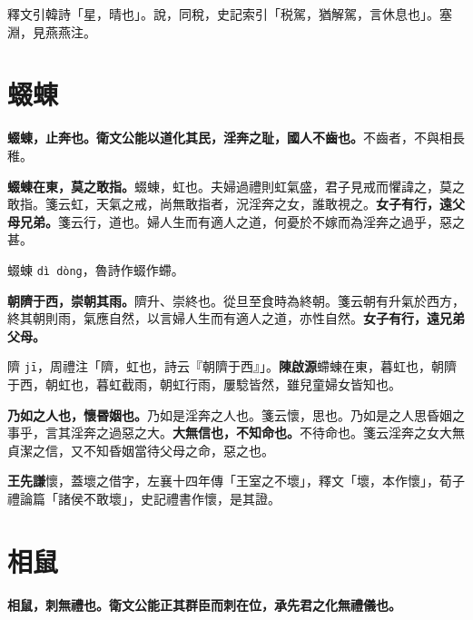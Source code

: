 \begin{quoting}釋文引韓詩「星，晴也」。說，同稅，史記索引「税駕，猶解駕，言休息也」。塞淵，見燕燕注。\end{quoting}

\section{蝃蝀}


\textbf{蝃蝀，止奔也。衛文公能以道化其民，淫奔之耻，國人不齒也。}{\footnotesize 不齒者，不與相長稚。}

\textbf{蝃蝀在東，莫之敢指。}{\footnotesize 蝃蝀，虹也。夫婦過禮則虹氣盛，君子見戒而懼諱之，莫之敢指。箋云虹，天氣之戒，尚無敢指者，況淫奔之女，誰敢視之。}\textbf{女子有行，遠父母兄弟。}{\footnotesize 箋云行，道也。婦人生而有適人之道，何憂於不嫁而為淫奔之過乎，惡之甚。}

\begin{quoting}蝃蝀 \texttt{dì dòng}，魯詩作蝃作螮。\end{quoting}

\textbf{朝隮于西，崇朝其雨。}{\footnotesize 隮升、崇終也。從旦至食時為終朝。箋云朝有升氣於西方，終其朝則雨，氣應自然，以言婦人生而有適人之道，亦性自然。}\textbf{女子有行，遠兄弟父母。}

\begin{quoting}隮 \texttt{jī}，周禮注「隮，虹也，詩云『朝隮于西』」。\textbf{陳啟源}螮蝀在東，暮虹也，朝隮于西，朝虹也，暮虹截雨，朝虹行雨，屢騐皆然，雖兒童婦女皆知也。\end{quoting}

\textbf{乃如之人也，懷昬姻也。}{\footnotesize 乃如是淫奔之人也。箋云懷，思也。乃如是之人思昏姻之事乎，言其淫奔之過惡之大。}\textbf{大無信也，不知命也。}{\footnotesize 不待命也。箋云淫奔之女大無貞潔之信，又不知昏姻當待父母之命，惡之也。}

\begin{quoting}\textbf{王先謙}懷，蓋壞之借字，左襄十四年傳「王室之不壞」，釋文「壞，本作懷」，荀子禮論篇「諸侯不敢壞」，史記禮書作懷，是其證。\end{quoting}

\section{相鼠}


\textbf{相鼠，刺無禮也。衛文公能正其群臣而刺在位，承先君之化無禮儀也。}


